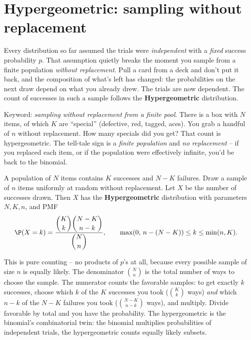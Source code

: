 \section{Hypergeometric: sampling without replacement}
\label{ch07:hypergeometric}

Every distribution so far assumed the trials were \emph{independent} with a
\emph{fixed} success probability $p$. That assumption quietly breaks the moment
you sample from a finite population \emph{without replacement}. Pull a card from a
deck and don't put it back, and the composition of what's left has changed: the
probabilities on the next draw depend on what you already drew. The trials are now
dependent. The count of successes in such a sample follows the
\textbf{Hypergeometric} distribution.

\begin{intuitionbox}
Keyword: \emph{sampling without replacement from a finite pool}. There is a box
with $N$ items, of which $K$ are ``special'' (defective, red, tagged, aces). You
grab a handful of $n$ without replacement. How many specials did you get? That
count is hypergeometric. The tell-tale sign is a \emph{finite population} and
\emph{no replacement} -- if you replaced each item, or if the population were
effectively infinite, you'd be back to the binomial.
\end{intuitionbox}

\begin{definition}
\label{ch07:def-hypergeom}
A population of $N$ items contains $K$ successes and $N-K$ failures. Draw a sample
of $n$ items uniformly at random without replacement. Let $X$ be the number of
successes drawn. Then $X$ has the \textbf{Hypergeometric} distribution with
parameters $N, K, n$, and PMF
\[
  \P(X = k) = \frac{\dbinom{K}{k}\dbinom{N-K}{\,n-k\,}}{\dbinom{N}{n}},
  \qquad \max(0,\, n-(N-K)) \le k \le \min(n, K).
\]
\end{definition}

\begin{whybox}
This is pure counting -- no products of $p$'s at all, because every possible
sample of size $n$ is equally likely. The denominator $\binom{N}{n}$ is the total
number of ways to choose the sample. The numerator counts the favorable samples:
to get exactly $k$ successes, choose which $k$ of the $K$ successes you took
($\binom{K}{k}$ ways) \emph{and} which $n-k$ of the $N-K$ failures you took
($\binom{N-K}{n-k}$ ways), and multiply. Divide favorable by total and you have
the probability. The hypergeometric is the binomial's combinatorial twin: the
binomial multiplies probabilities of independent trials, the hypergeometric
counts equally likely subsets.
\end{whybox}

